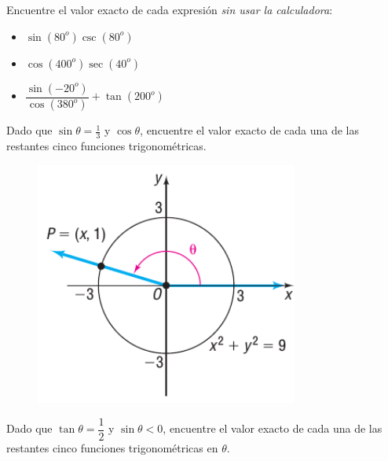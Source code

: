 {}
	\begin{problema}
		Encuentre el valor exacto de cada expresión \emph{sin usar la calculadora}:
		\begin{itemize}
			\item $\sin(80^{o})\csc(80^{o})$
			\item $\cos(400^{o})\sec(40^{o})$
			\item $\dfrac{\sin(-20^{o})}{\cos(380^{o})}+\tan(200^{o})$
		\end{itemize}
		
	\end{problema}
	


	\begin{problema}
		\label{exmp:sull6305}
		Dado que $\sin\theta=\frac{1}{3}$ y $\cos\theta$, encuentre el valor exacto de cada una de las restantes cinco funciones trigonométricas.
	\end{problema}
	

{}
	\begin{figure}
		\centering
		\includegraphics[height=8cm]{./trig/sull0641.png}
		\label{fig:0641}
	\end{figure}
	

{}
	

{}
	\begin{problema}
		Dado que $\tan\theta=\dfrac{1}{2}$ y $\sin\theta<0$, encuentre el valor exacto de cada una de las restantes cinco funciones trigonométricas en $\theta$.
	\end{problema}
	

